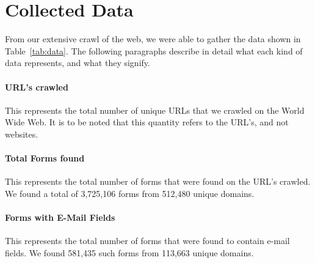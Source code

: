 \section{Collected Data}
From our extensive crawl of the web, we were able to gather the data shown in Table~\ref{tab:data}. The following paragraphs describe in detail what each kind of data represents, and what they signify.



\paragraph{URL's crawled}
This represents the total number of unique URLs that we crawled on the World Wide Web. It is to be noted that this quantity refers to the URL's, and not websites.

\paragraph{Total Forms found}
This represents the total number of forms that were found on the URL's crawled. We found a total of 3,725,106 forms from 
512,480 unique domains.

\paragraph{Forms with E-Mail Fields}
This represents the total number of forms that were found to contain e-mail fields. We found 581,435 such forms from 113,663 unique domains.
